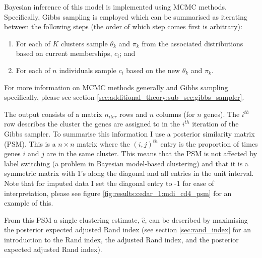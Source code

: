 \documentclass[14pt]{extarticle} %
\begin{document}
	Bayesian inference of this model is implemented using MCMC methods. Specifically, Gibbs sampling is employed which can be summarised as iterating between the following steps (the order of which step comes first is arbitrary):
	\begin{enumerate}
		\item For each of $K$ clusters sample $\theta_k$ and $\pi_k$ from the associated distributions based on current memberships, $c_i$; and
		\item For each of $n$ individuals sample $c_i$ based on the new $\theta_k$ and $\pi_k$.
	\end{enumerate}
	For more information on MCMC methods generally and Gibbs sampling specifically, please see section \ref{sec:additional_theory:sub_sec:gibbs_sampler}.
	
	
	The output consists of a matrix $n_{iter}$ rows and $n$ columns (for $n$ genes). The $i^{th}$ row describes the cluster the genes are assigned to in the $i^{th}$ iteration of the Gibbs sampler. To summarise this information I use a posterior similarity matrix (PSM). This is a $n \times n$ matrix where the $(i,j)^{th}$ entry is the proportion of times genes $i$ and $j$ are in the same cluster. This means that the PSM is not affected by label switching (a problem in Bayesian model-based clustering) and that it is a symmetric matrix with $1$'s along the diagonal and all entries in the unit interval. Note that for imputed data I set the diagonal entry to -1 for ease of interpretation, please see figure \ref{fig:results:cedar_1:mdi_cd4_psm} for an example of this.
	
	From this PSM a single clustering estimate, $\hat{c}$, can be described by maximising the posterior expected adjusted Rand index \citep{FritschImprovedcriteriaclustering2009} (see section \ref{sec:rand_index} for an introduction to the Rand index, the adjusted Rand index, and the posterior expected adjusted Rand index).
	
	
\end{document}
